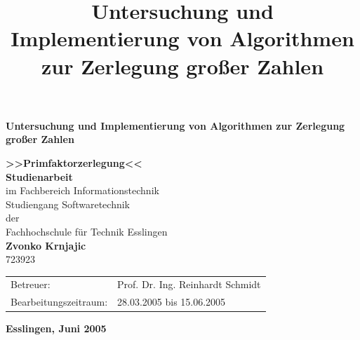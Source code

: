 \documentclass[10pt, bigheadings]{scrartcl}
\title{Untersuchung und Implementierung von Algorithmen
	zur Zerlegung großer Zahlen}
\begin{document}
\begin{titlepage}
\vspace*{2cm}
\begin{center}
\textbf{\huge Untersuchung und Implementierung von Algorithmen
	zur Zerlegung großer Zahlen}\\
\vspace*{0.5cm}
\begin{Large}
\textbf{>>Primfaktorzerlegung<<\\}
\vspace*{3.5cm}
\textbf{Studienarbeit}\\
im Fachbereich Informationstechnik\\
Studiengang Softwaretechnik\\
der\\
Fachhochschule für Technik Esslingen\\
\vspace*{2cm}
\textbf{Zvonko Krnjajic}\\
\vspace*{0.2cm}
723923
\vspace*{3.5cm}
\end{Large}
\end{center}
\begin{Large}
\begin{tabularx}{\textwidth}{ll}
Betreuer: & Prof. Dr. Ing. Reinhardt Schmidt\\
Bearbeitungszeitraum: & 28.03.2005 bis 15.06.2005
\end{tabularx}
\vspace*{1.5cm}
\end{Large}
\begin{center}
\begin{Large}
\textbf{Esslingen,  Juni 2005}
\end{Large}
\end{center}
\end{titlepage}
\end{document}
